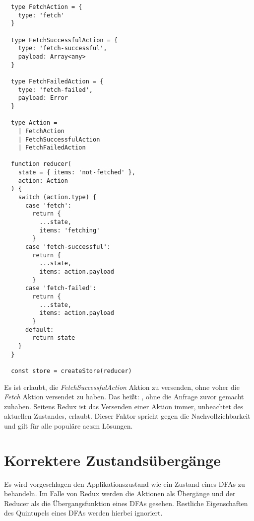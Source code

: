 \begin{lstlisting}
  type FetchAction = {
    type: 'fetch'
  }

  type FetchSuccessfulAction = {
    type: 'fetch-successful',
    payload: Array<any>
  }

  type FetchFailedAction = {
    type: 'fetch-failed',
    payload: Error
  }

  type Action =
    | FetchAction
    | FetchSuccessfulAction
    | FetchFailedAction

  function reducer(
    state = { items: 'not-fetched' }, 
    action: Action
  ) {
    switch (action.type) {
      case 'fetch':
        return {
          ...state,
          items: 'fetching'
        }
      case 'fetch-successful':
        return {
          ...state,
          items: action.payload
        }
      case 'fetch-failed':
        return {
          ...state,
          items: action.payload
        }
      default:
        return state
    }
  }
  
  const store = createStore(reducer)
\end{lstlisting}

Es ist erlaubt, die \textit{FetchSuccessfulAction} Aktion zu versenden, ohne voher die \textit{Fetch} Aktion versendet zu haben. Das heißt: , ohne die Anfrage zuvor gemacht zuhaben. Seitens Redux ist das Versenden einer Aktion immer, unbeachtet des aktuellen Zustandes, erlaubt. Dieser Faktor spricht gegen die Nachvollziehbarkeit und gilt für alle populäre \acrshort{ac:sm} Lösungen.

\section {Korrektere Zustandsübergänge}



Es wird vorgeschlagen den Applikationszustand wie ein Zustand eines DFAs zu behandeln. Im Falle von Redux werden die Aktionen als Übergänge und der Reducer als die Übergangsfunktion eines DFAs gesehen. Restliche Eigenschaften des Quintupels eines DFAs werden hierbei ignoriert.

